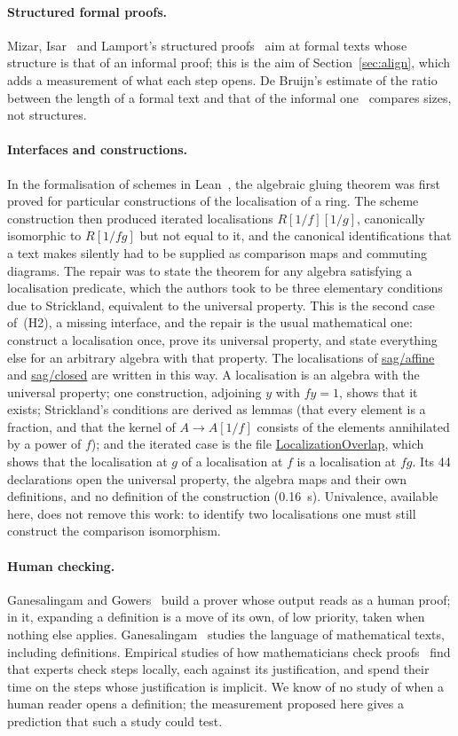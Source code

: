 \documentclass[11pt]{article}
\begin{document}
\paragraph{Structured formal proofs.} Mizar, Isar~\cite{Isar} and
Lamport's structured proofs~\cite{Lamport} aim at formal texts whose
structure is that of an informal proof; this is the aim of
Section~\ref{sec:align}, which adds a measurement of what each step
opens. De Bruijn's
estimate of the ratio between the length of a formal text and that of
the informal one~\cite{Survey} compares sizes, not structures.

\paragraph{Interfaces and constructions.} In the formalisation of
schemes in Lean~\cite{SiL}, the algebraic gluing theorem was first
proved for particular constructions of the localisation of a ring. The
scheme construction then produced iterated localisations
$R[1/f][1/g]$, canonically isomorphic to $R[1/fg]$ but not equal to it,
and the canonical identifications that a text makes silently had to be
supplied as comparison maps and commuting diagrams. The repair was to
state the theorem for any algebra satisfying a localisation predicate,
which the authors took to be three elementary conditions due to
Strickland, equivalent to the universal property. This is the second
case of~(H2), a missing interface, and the repair is the usual
mathematical one: construct a localisation once, prove its universal
property, and state everything else for an arbitrary algebra with that
property. The localisations of \url{sag/affine} and \url{sag/closed} are
written in this way. A localisation is an algebra with the universal
property; one construction, adjoining $y$ with $fy=1$, shows that it
exists; Strickland's conditions are derived as lemmas (that every
element is a fraction, and that the kernel of $A\to A[1/f]$ consists of
the elements annihilated by a power of $f$); and the iterated case is
the file \url{LocalizationOverlap}, which shows that the localisation at $g$ of a
localisation at $f$ is a localisation at $fg$. Its 44 declarations open
the universal property, the algebra maps and their own definitions, and
no definition of the construction (0.16~s). Univalence, available
here, does not remove this work: to identify two localisations one must
still construct the comparison isomorphism.

\paragraph{Human checking.} Ganesalingam and Gowers~\cite{GG} build a
prover whose output reads as a human proof; in it, expanding a definition
is a move of its own, of low priority, taken when nothing else applies.
Ganesalingam~\cite{Gan} studies the language of mathematical texts,
including definitions. Empirical studies of how mathematicians check
proofs~\cite{Weber,IA} find that experts check steps locally, each
against its justification, and spend their time on the steps whose
justification is implicit. We know of no study of when a human reader
opens a definition; the measurement proposed here gives a prediction
that such a study could test.
\end{document}
